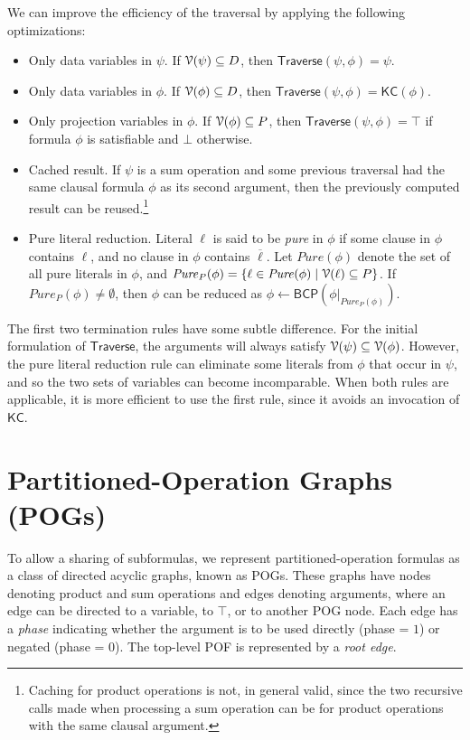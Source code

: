 \documentclass[letterpaper,USenglish,cleveref, autoref, thm-restate]{lipics-v2021}
\newcommand{\tautology}{\top}
\newcommand{\nil}{\bot}
\newcommand{\obar}[1]{\overline{#1}}
\newcommand{\lit}{\ell}
\newcommand{\dvarset}{D}
\newcommand{\pvarset}{P}
\newcommand{\dependencyset}{{\cal V}}
\newcommand{\pure}{\mathit{Pure}}
\newcommand{\simplify}[2]{#1|_{#2}}
\newcommand{\algo}[1]{\textsf{#1}}
\newcommand{\kc}{\algo{KC}}
\newcommand{\traverse}{\algo{Traverse}}
\newcommand{\bcp}{\algo{BCP}}
\begin{document}
We can improve the efficiency of the traversal by applying the following optimizations:
\begin{itemize}
\item Only data variables in $\psi$.  If $\dependencyset(\psi) \subseteq \dvarset$, then $\traverse(\psi, \phi) = \psi$.
\item Only data variables in $\phi$.  If $\dependencyset(\phi) \subseteq \dvarset$, then $\traverse(\psi, \phi) = \kc(\phi)$.
\item Only projection variables in $\phi$.  If $\dependencyset(\phi) \subseteq \pvarset$, then $\traverse(\psi, \phi) = \tautology$ if formula $\phi$ is satisfiable and $\nil$ otherwise.
\item Cached result. If $\psi$ is a sum operation and some previous traversal had the same clausal formula $\phi$ as its second argument, then the previously computed result can be reused.\footnote{
Caching for product operations is not, in general valid, since the two recursive calls made when processing a sum operation can be for product operations with the same clausal argument.}
\item Pure literal reduction.
Literal $\lit$ is said to be \emph{pure} in $\phi$ if some clause in $\phi$ contains $\lit$, and no clause in $\phi$ contains  $\obar{\lit}$.
Let $\pure(\phi)$ denote the set of all pure literals in $\phi$, and $\pure_{\pvarset}(\phi) = \{ \lit \in \pure(\phi) \mid  \dependencyset(\lit) \subseteq \pvarset \}$.
If $\pure_{\pvarset}(\phi) \not = \emptyset$, then $\phi$ can be reduced as
$\phi \leftarrow \bcp(\simplify{\phi}{\pure_{\pvarset}(\phi)})$.
\end{itemize}

The first two termination rules have some subtle difference.  For the
initial formulation of $\traverse$, the arguments will always satisfy
$\dependencyset(\psi) \subseteq \dependencyset(\phi)$.  However, the
pure literal reduction rule can eliminate some literals from $\phi$
that occur in $\psi$, and so the two sets of variables can become
incomparable.  When both rules are applicable, it is more efficient to use the first rule, since it avoids an invocation of $\kc$.

\section{Partitioned-Operation Graphs (POGs)}

To allow a sharing of subformulas, we represent partitioned-operation
formulas as a class of directed acyclic graphs, known as POGs.  These
graphs have nodes denoting product and sum operations and edges
denoting arguments, where an edge can be directed to a variable, to
$\tautology$, or to another POG node.  Each edge has a \emph{phase}
indicating whether  the argument is to be used directly
(phase = $1$) or negated (phase = $0$).  The top-level POF is represented by a \emph{root edge}.
\end{document}

